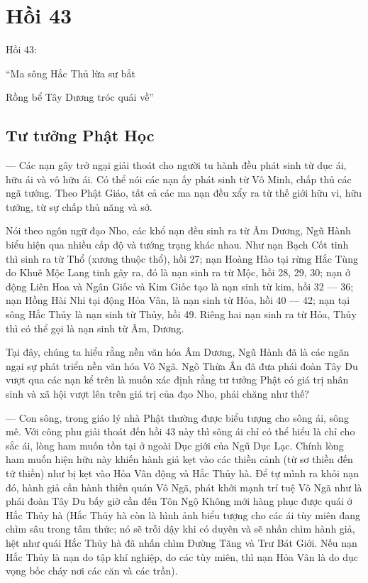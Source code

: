 \chapter{Hồi 43} %
\label{cha:hoi_43}

Hồi 43:

\begin{itshape}
``Ma sông Hắc Thủ lừa sư bắt

Rồng bể Tây Dương tróc quái về''
\end{itshape}

\section{Tư tưởng Phật Học} %
\label{sec:43_phat_hoc}

— Các nạn gây trở ngại giải thoát cho người tu hành đều phát sinh từ dục ái, hữu ái và vô hữu ái. Có thể nói các nạn ấy phát sinh từ Vô Minh, chấp thủ các ngã tướng. Theo Phật Giáo, tất cả các ma nạn đều xẩy ra từ thế giới hữu vi, hữu tướng, từ sự chấp thủ năng và sở.

Nói theo ngôn ngữ đạo Nho, các khổ nạn đều sinh ra từ Âm Dương, Ngũ Hành biểu hiện qua nhiều cấp độ và tướng trạng khác nhau. Như nạn Bạch Cốt tinh thì sinh ra từ Thổ (xương thuộc thổ), hồi 27; nạn Hoàng Hào tại rừng Hắc Tùng do Khuê Mộc Lang tinh gây ra, đó là nạn sinh ra từ Mộc, hồi 28, 29, 30; nạn ở động Liên Hoa và Ngân Giốc và Kim Giốc tạo là nạn sinh từ kim, hồi 32 — 36; nạn Hồng Hài Nhi tại động Hỏa Vân, là nạn sinh từ Hỏa, hồi 40 — 42; nạn tại sông Hắc Thủy là nạn sinh từ Thủy, hồi 49. Riêng hai nạn sinh ra từ Hỏa, Thủy thì có thể gọi là nạn sinh từ Âm, Dương.

Tại đây, chúng ta hiểu rằng nền văn hóa Âm Dương, Ngũ Hành đã là các ngăn ngại sự phát triển nền văn hóa Vô Ngã. Ngô Thừa Ân đã đưa phái đoàn Tây Du vượt qua các nạn kể trên là muốn xác định rằng tư tưởng Phật có giá trị nhân sinh và xã hội vượt lên trên giá trị của đạo Nho, phải chăng như thế?

— Con sông, trong giáo lý nhà Phật thường được biểu tượng cho sông ái, sông mê. Với công phu giải thoát đến hồi 43 này thì sông ái chỉ có thể hiểu là chỉ cho sắc ái, lòng ham muốn tồn tại ở ngoài Dục giới của Ngũ Dục Lạc. Chính lòng ham muốn hiện hữu này khiến hành giả kẹt vào các thiền cảnh (từ sơ thiền đến tứ thiền) như bị kẹt vào Hỏa Vân động và Hắc Thủy hà. Để tự mình ra khỏi nạn đó, hành giả cần hành thiền quán Vô Ngã, phát khởi mạnh trí tuệ Vô Ngã như là phái đoàn Tây Du bấy giờ cần đến Tôn Ngộ Không mới hàng phục được quái ở Hắc Thủy hà (Hắc Thủy hà còn là hình ảnh biểu tượng cho các ái tùy miên đang chìm sâu trong tâm thức; nó sẽ trỗi dậy khi có duyên và sẽ nhấn chìm hành giả, hệt như quái Hắc Thủy hà đã nhấn chìm Đường Tăng và Trư Bát Giới. Nếu nạn Hắc Thủy là nạn do tập khí nghiệp, do các tùy miên, thì nạn Hỏa Vân là do dục vọng bốc cháy nơi các căn và các trần).

